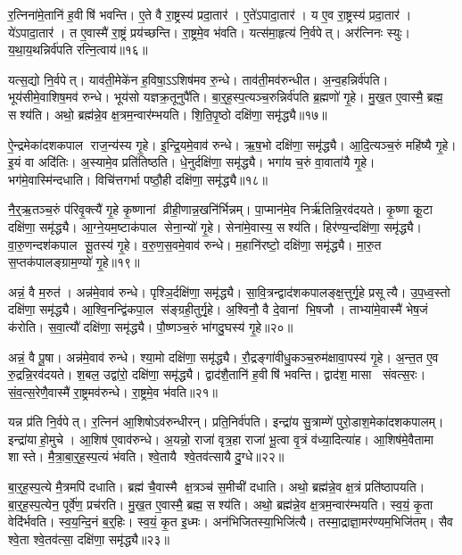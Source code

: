 र॒त्निना॑मे॒तानि॑ ह॒वीषि॑ भवन्ति। ए॒ते वै रा॒ष्ट्रस्य॑ प्रदा॒तार॑। ए॒ते॑ऽपादा॒तार॑। य ए॒व रा॒ष्ट्रस्य॑ प्रदा॒तार॑। ये॑ऽपादा॒तार॑। त ए॒वास्मै॑ रा॒ष्ट्रं प्रय॑च्छन्ति। रा॒ष्ट्रमे॒व भ॑वति। यत्स॑मा॒हृत्य॑ नि॒र्वपेत्। अर॑त्निनः स्युः। य॒था॒य॒थन्निर्व॑पति रत्नि॒त्वाय॑॥१६॥

यत्स॒द्यो नि॒र्वपेत्। याव॑ती॒मेके॑न ह॒विषा॒ऽऽशिष॑मव रु॒न्धे। ताव॑ती॒मव॑रुन्धीत। अ॒न्व॒हन्निर्व॑पति। भूय॑सीमे॒वाशिष॒मव॑ रुन्धे। भूय॑सो यज्ञक्र॒तूनुपै॑ति। बा॒र्॒ह॒स्प॒त्यञ्च॒रुन्निर्व॑पति ब्र॒ह्मणो॑ गृ॒हे। मु॒ख॒त ए॒वास्मै॒ ब्रह्म॒ सश्य॑ति। अथो॒ ब्रह्म॑न्ने॒व क्ष॒त्रम॒न्वार॑म्भयति। शि॒ति॒पृ॒ष्ठो दक्षि॑णा॒ समृ॑द्ध्यै॥१७॥

ऐ॒न्द्रमेका॑दशकपाल राज॒न्य॑स्य गृ॒हे। इ॒न्द्रि॒यमे॒वाव॑ रुन्धे। ऋ॒ष॒भो दक्षि॑णा॒ समृ॑द्ध्यै। आ॒दि॒त्यञ्च॒रुं महि॑ष्यै गृ॒हे। इ॒यं वा अदि॑तिः। अ॒स्यामे॒व प्रति॑तिष्ठति। धे॒नुर्दक्षि॑णा॒ समृ॑द्ध्यै। भगा॑य च॒रुं वा॒वाता॑यै गृ॒हे। भग॑मे॒वास्मि॑न्दधाति। विचि॑त्तगर्भा पष्ठौ॒ही दक्षि॑णा॒ समृ॑द्ध्यै॥१८॥

नै॒र्॒ऋ॒तञ्च॒रुं प॑रिवृ॒क्त्यै॑ गृ॒हे कृ॒ष्णानां व्रीही॒णान्न॒खनि॑र्भिन्नम्। पा॒प्मान॑मे॒व निर्\mbox{}ऋ॑तिन्नि॒रव॑दयते। कृ॒ष्णा कू॒टा दक्षि॑णा॒ समृ॑द्ध्यै। आ॒ग्ने॒यम॒ष्टाक॑पाल सेना॒न्यो॑ गृ॒हे। सेना॑मे॒वास्य॒ सश्य॑ति। हिर॑ण्य॒न्दक्षि॑णा॒ समृ॑द्ध्यै। वा॒रु॒णन्दश॑कपाल सू॒तस्य॑ गृ॒हे। व॒रु॒ण॒स॒वमे॒वाव॑ रुन्धे। म॒हानि॑रष्टो॒ दक्षि॑णा॒ समृ॑द्ध्यै। मा॒रु॒त स॒प्तक॑पालङ्ग्राम॒ण्यो॑ गृ॒हे॥१९॥

अन्नं॒ वै म॒रुत॑। अन्न॑मे॒वाव॑ रुन्धे। पृश्ञि॒र्दक्षि॑णा॒ समृ॑द्ध्यै। सा॒वि॒त्रन्द्वाद॑शकपालङ्क्ष॒त्तुर्गृ॒हे प्रसूत्यै। उ॒प॒ध्व॒स्तो दक्षि॑णा॒ समृ॑द्ध्यै। आ॒श्वि॒नन्द्वि॑कपा॒ल स॑ङ्ग्रही॒तुर्गृ॒हे। अ॒श्विनौ॒ वै दे॒वानां भि॒षजौ। ताभ्या॑मे॒वास्मै॑ भेष॒जं क॑रोति। स॒वा॒त्यौ॑ दक्षि॑णा॒ समृ॑द्ध्यै। पौ॒ष्णञ्च॒रुं भा॑गदु॒घस्य॑ गृ॒हे॥२०॥

अन्नं॒ वै पू॒षा। अन्न॑मे॒वाव॑ रुन्धे। श्या॒मो दक्षि॑णा॒ समृ॑द्ध्यै। रौ॒द्रङ्गा॑वीधु॒कञ्च॒रुम॑क्षावा॒पस्य॑ गृ॒हे। अ॒न्त॒त ए॒व रु॒द्रन्नि॒रव॑दयते। श॒बल॒ उद्वा॑रो॒ दक्षि॑णा॒ समृ॑द्ध्यै। द्वाद॑शै॒तानि॑ ह॒वीषि॑ भवन्ति। द्वाद॑श॒ मासा संवत्स॒रः। सं॒व॒त्स॒रेणै॒वास्मै॑ रा॒ष्ट्रमव॑रुन्धे। रा॒ष्ट्रमे॒व भ॑वति॥२१॥

यन्न प्र॑ति नि॒र्वपेत्। र॒त्निन॑ आ॒शिषोऽव॑रुन्धीरन्। प्रति॒निर्व॑पति। इन्द्रा॑य सु॒त्राम्णे॑ पुरो॒डाश॒मेका॑दशकपालम्। इन्द्रा॑याहो॒मुचे। आ॒शिष॑ ए॒वाव॑रुन्धे। अ॒यन्नो॒ राजा॑ वृत्र॒हा राजा॑ भू॒त्वा वृ॒त्रं व॑ध्या॒दित्या॑ह। आ॒शिष॑मे॒वैतामा शास्ते। मै॒त्रा॒बा॒र्॒ह॒स्प॒त्यं भ॑वति। श्वे॒तायै श्वे॒तव॑त्सायै दु॒ग्धे॥२२॥

बा॒र्॒ह॒स्प॒त्ये मै॒त्रमपि॑ दधाति। ब्रह्म॑ चै॒वास्मै क्ष॒त्रञ्च॑ स॒मीची॑ दधाति। अथो॒ ब्रह्म॑न्ने॒व क्ष॒त्रं प्रति॑ष्ठापयति। बा॒र्॒ह॒स्प॒त्येन॒ पूर्वे॑ण॒ प्रच॑रति। मु॒ख॒त ए॒वास्मै॒ ब्रह्म॒ सश्य॑ति। अथो॒ ब्रह्म॑न्ने॒व क्ष॒त्रम॒न्वार॑म्भयति। स्व॒यं॒ कृ॒ता वेदि॑र्भवति। स्व॒य॒न्दि॒नं ब॒र्॒हिः। स्व॒यं॒ कृ॒त इ॒ध्मः। अन॑भिजितस्या॒भिजि॑त्यै। तस्मा॒द्राज्ञा॒मर॑ण्यम॒भिजि॑तम्। सैव श्वे॒ता श्वे॒तव॑त्सा॒ दक्षि॑णा॒ समृ॑द्ध्यै॥२३॥\anuvakamend[र॒त्नि॒त्वाय॒ समृ॑द्ध्यै पष्ठौ॒ही दक्षि॑णा॒ समृ॑द्ध्यै ग्राम॒ण्यो॑ गृ॒हे भा॑गदु॒घस्य॑ गृ॒हे भ॑वति दु॒ग्धे॑ऽभिजि॑त्यै॒ द्वे च॑]

